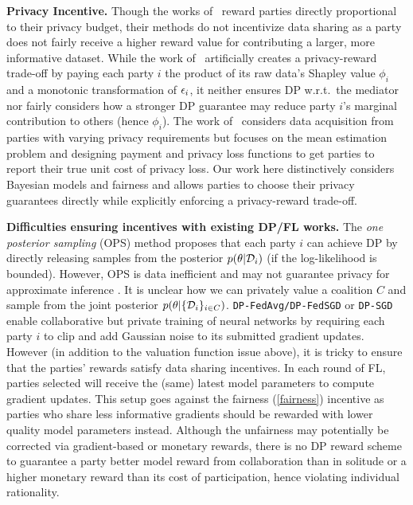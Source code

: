 \documentclass{article}
\DeclareRobustCommand{\hlp}[1]
{{#1}}
\theoremstyle{plain}
\theoremstyle{definition}
\theoremstyle{remark}
\renewcommand{\citet}[1]{\cite{#1}}
\begin{document}
\textbf{Privacy Incentive.} Though the works of~\citet{hu2020privatefl,Xu22} reward parties directly proportional to their privacy budget,
\hlp{their methods do not incentivize data sharing as a party does not fairly receive a higher reward value for contributing a larger, more informative dataset.} While the work of~\citet{liu2021dealer} artificially creates a privacy-reward trade-off by paying each party $i$ the product of its raw data's Shapley value $\phi_i$ and a monotonic transformation of ${\epsilon}_i$, it neither ensures DP w.r.t.~the mediator nor fairly considers how a stronger DP guarantee may reduce party $i$'s marginal contribution to others (hence $\phi_i$). The work of~\citet{fallah2022arx} considers data acquisition from parties with varying privacy requirements but focuses on the mean estimation problem and designing payment and privacy loss functions to get parties to report their true unit cost of privacy loss.
Our work here distinctively considers Bayesian models and fairness and allows parties to choose their privacy guarantees directly while explicitly enforcing a privacy-reward trade-off. 

\textbf{Difficulties ensuring incentives with existing DP/FL works.} The \emph{one posterior sampling} (OPS) method \cite{free-ops,geumlek17rdps} proposes that each party $i$ can achieve DP by directly releasing samples from the posterior $p(\theta|{\mathcal{D}}_i)$  (if the log-likelihood is bounded). However, OPS is data inefficient and may not guarantee privacy for approximate inference \cite{foulds16pbayes}. It is unclear how we can privately value a coalition $C$ and sample from the joint posterior $p(\theta | \{ {\mathcal{D}}_i\}_{i \in C})$. \texttt{DP-FedAvg/DP-FedSGD} \cite{mcmahan2017learning} or \texttt{DP-SGD} \cite{abadi2016deep} enable collaborative but private training of neural networks by requiring each party $i$ to clip and add Gaussian noise to its submitted gradient updates. However (in addition to the valuation function issue above), it is tricky to ensure that the parties' rewards satisfy data sharing incentives. In each round of FL, parties selected will receive the (same) latest model parameters to compute gradient updates. This setup goes against the fairness (\ref{fairness}) incentive as parties who share less informative gradients should be rewarded with lower quality model parameters instead. Although the unfairness may potentially be corrected via gradient-based \cite{xu2021gradient} or monetary rewards, there is no DP reward scheme to guarantee a party better model reward from collaboration than in solitude or a higher monetary reward than its cost of participation, hence violating individual rationality.
\end{document}
